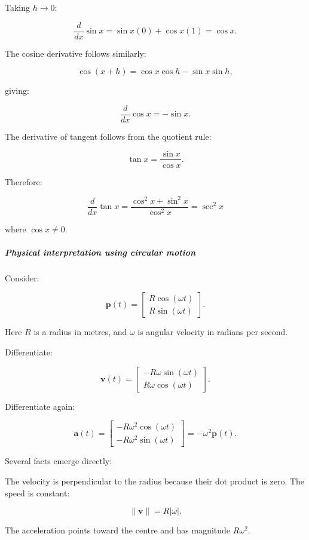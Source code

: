 Taking \(h\to0\):

\[
\frac d{dx}\sin x =\sin x(0)+\cos x(1) =\cos x.
\]

The cosine derivative follows similarly:

\[
\cos(x+h)=\cos x\cos h-\sin x\sin h,
\]

giving:

\[
\frac d{dx}\cos x=-\sin x.
\]

The derivative of tangent follows from the quotient rule:

\[
\tan x=\frac{\sin x}{\cos x}.
\]

Therefore:

\[
\frac d{dx}\tan x = \frac{\cos^2x+\sin^2x}{\cos^2x} = \boxed{\sec^2x}
\]

where \(\cos x\ne0\).

\subparagraph{Physical interpretation using circular motion}\label{01-foundations-i-ch020-physical-interpretation-using-circular-motion}

\hypertarget{01-foundations-i-ch020-physical-interpretation-using-circular-motion}{}

Consider:

\[
\mathbf p(t)= \begin{bmatrix} R\cos(\omega t)\\ R\sin(\omega t) \end{bmatrix}.
\]

Here \(R\) is a radius in metres, and \(\omega\) is angular velocity in radians per second.

Differentiate:

\[
\mathbf v(t)= \begin{bmatrix} -R\omega\sin(\omega t)\\ R\omega\cos(\omega t) \end{bmatrix}.
\]

Differentiate again:

\[
\mathbf a(t)= \begin{bmatrix} -R\omega^2\cos(\omega t)\\ -R\omega^2\sin(\omega t) \end{bmatrix} =-\omega^2\mathbf p(t).
\]

Several facts emerge directly:

The velocity is perpendicular to the radius because their dot product is zero. The speed is constant:

\[
\|\mathbf v\|=R|\omega|.
\]

The acceleration points toward the centre and has magnitude \(R\omega^2\).

